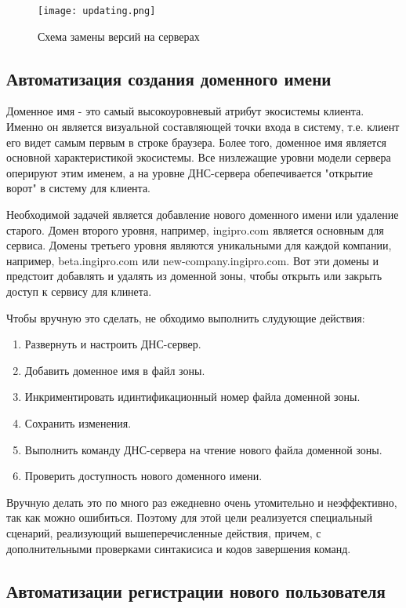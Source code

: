 \begin{figure}[H]
\centering
\texttt{[image: updating.png]}
\caption{Схема замены версий на серверах}
\label{img:updating}
\end{figure} 


\subsection{Автоматизация создания доменного имени}

Доменное имя - это самый высокоуровневый атрибут экосистемы клиента. Именно он является визуальной составляющей точки входа в систему, т.е. клиент его видет самым первым в строке браузера. Более того, доменное имя является основной характеристикой экосистемы. Все низлежащие уровни модели сервера оперируют этим именем, а на уровне ДНС-сервера обепечивается "открытие ворот" в систему для клиента. 

Необходимой задачей является добавление нового доменного имени или удаление старого. Домен второго уровня, например, {\ttfamily ingipro.com} является основным для сервиса. Домены третьего уровня являются уникальными для каждой компании, например, {\ttfamily beta.ingipro.com} или {\ttfamily new-company.ingipro.com}. Вот эти домены и предстоит добавлять и удалять из доменной зоны, чтобы открыть или закрыть доступ к сервису для клинета.

Чтобы вручную это сделать, не обходимо выполнить слудующие действия:
\begin{enumerate}
	\item Развернуть и настроить ДНС-сервер.
	\item Добавить доменное имя в файл зоны.
	\item Инкриментировать идинтификационный номер файла доменной зоны.
	\item Сохранить изменения.
	\item Выполнить команду ДНС-сервера на чтение нового файла доменной зоны.
	\item Проверить доступность нового доменного имени.
\end{enumerate}
Вручную делать это по много раз ежедневно очень утомительно и неэффективно, так как можно ошибиться. Поэтому для этой цели реализуется специальный сценарий, реализующий вышеперечисленные действия, причем, с дополнительными проверками синтакисиса и кодов завершения команд.


\subsection{Автоматизации регистрации нового пользователя}

